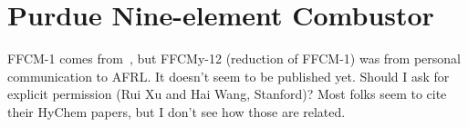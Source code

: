 \section{Purdue Nine-element Combustor}

{\color{red}FFCM-1 comes from~\cite{ffcm1}, but FFCMy-12 (reduction of FFCM-1) was from personal communication to AFRL. It doesn't seem to be published yet. Should I ask for explicit permission (Rui Xu and Hai Wang, Stanford)? Most folks seem to cite their HyChem papers, but I don't see how those are related.}